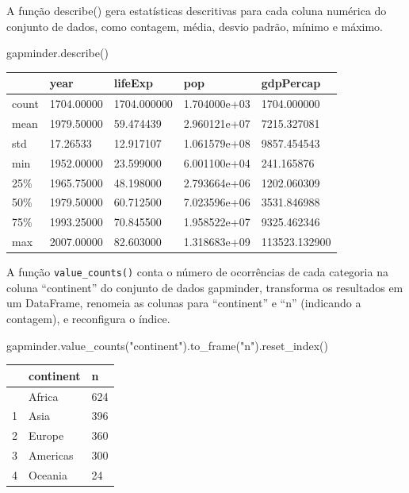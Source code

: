 \documentclass[
  portuguese,
  letterpaper,
  DIV=11,
  numbers=noendperiod]{scrreprt}
\newenvironment{Shaded}{\begin{snugshade}}{\end{snugshade}}
\newcommand{\NormalTok}[1]{\textcolor[rgb]{0.00,0.23,0.31}{#1}}
\newcommand{\StringTok}[1]{\textcolor[rgb]{0.13,0.47,0.30}{#1}}
\theoremstyle{definition}
\theoremstyle{remark}
\begin{document}
A função describe() gera estatísticas descritivas para cada coluna
numérica do conjunto de dados, como contagem, média, desvio padrão,
mínimo e máximo.

\begin{Shaded}
\begin{Highlighting}[]
\NormalTok{gapminder.describe()}
\end{Highlighting}
\end{Shaded}

\begin{longtable}[]{@{}lllll@{}}
\toprule\noalign{}
& year & lifeExp & pop & gdpPercap \\
\midrule\noalign{}
\endhead
\bottomrule\noalign{}
\endlastfoot
count & 1704.00000 & 1704.000000 & 1.704000e+03 & 1704.000000 \\
mean & 1979.50000 & 59.474439 & 2.960121e+07 & 7215.327081 \\
std & 17.26533 & 12.917107 & 1.061579e+08 & 9857.454543 \\
min & 1952.00000 & 23.599000 & 6.001100e+04 & 241.165876 \\
25\% & 1965.75000 & 48.198000 & 2.793664e+06 & 1202.060309 \\
50\% & 1979.50000 & 60.712500 & 7.023596e+06 & 3531.846988 \\
75\% & 1993.25000 & 70.845500 & 1.958522e+07 & 9325.462346 \\
max & 2007.00000 & 82.603000 & 1.318683e+09 & 113523.132900 \\
\end{longtable}

A função \texttt{value\_counts()} conta o número de ocorrências de cada
categoria na coluna ``continent'' do conjunto de dados gapminder,
transforma os resultados em um DataFrame, renomeia as colunas para
``continent'' e ``n'' (indicando a contagem), e reconfigura o índice.

\begin{Shaded}
\begin{Highlighting}[]
\NormalTok{gapminder.value\_counts(}\StringTok{"continent"}\NormalTok{).to\_frame(}\StringTok{"n"}\NormalTok{).reset\_index()}
\end{Highlighting}
\end{Shaded}

\begin{longtable}[]{@{}lll@{}}
\toprule\noalign{}
& continent & n \\
\midrule\noalign{}
\endhead
\bottomrule\noalign{}
\endlastfoot
0 & Africa & 624 \\
1 & Asia & 396 \\
2 & Europe & 360 \\
3 & Americas & 300 \\
4 & Oceania & 24 \\
\end{longtable}
\end{document}
